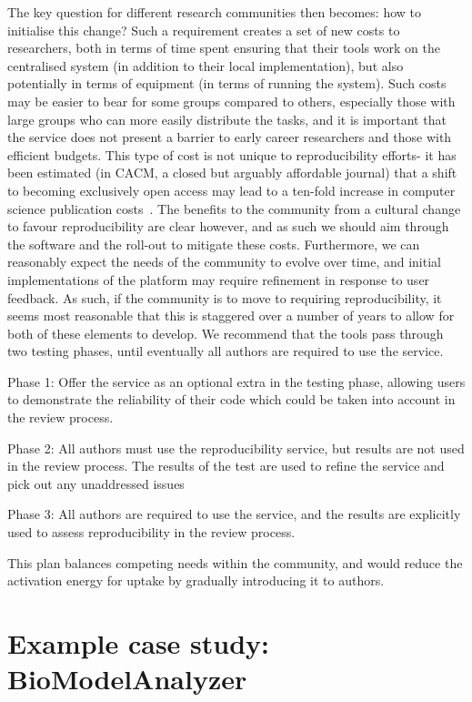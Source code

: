 \documentclass{llncs}
\begin{document}
The key question for different research communities then becomes: how to initialise 
this change? Such a requirement creates a set of new costs to researchers, both in 
terms of time spent ensuring that their tools work on the centralised system (in 
addition to their local implementation), but also potentially in terms of equipment
(in terms of running the system). Such costs may be easier to bear for some groups 
compared to others, especially those with large groups who can more easily distribute 
the tasks, and it is important that the service does not present a barrier to early 
career researchers and those with efficient budgets. This type of cost is not unique 
to reproducibility efforts- it has been estimated (in CACM, a closed but arguably 
affordable journal) that a shift to becoming exclusively open access may lead to a 
ten-fold increase in computer science publication costs~\cite{vardi-cacm-2014}. The
benefits to the community from a cultural change to favour reproducibility are clear
however, and as such we should aim through the software and the roll-out to mitigate 
these costs. Furthermore,
we can reasonably expect the needs of the community to evolve over time, and initial 
implementations of the platform may require refinement in response to user feedback. As
such, if the community is to move to requiring reproducibility, it seems most reasonable
that this is staggered over a number of years to allow for both of these elements to
develop. We recommend that the tools pass through two testing phases, until eventually
all authors are required to use the service.

Phase 1: Offer the service as an optional extra in the testing phase, allowing users to demonstrate 
the reliability of their code which could be taken into account in the review process.

Phase 2: All authors must use the reproducibility service, but results are not used in the review
process. The results of the test are used to refine the service and pick out any unaddressed issues

Phase 3: All authors are required to use the service, and the results are explicitly used to 
assess reproducibility in the review process.

This plan balances competing needs within the community, and would reduce the activation
energy for uptake by gradually introducing it to authors.

\section{Example case study: BioModelAnalyzer}\label{example}
\end{document}
